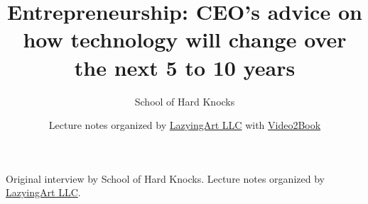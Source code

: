 \documentclass[11pt,oneside]{book}
\begin{document}
\frontmatter
\title{Entrepreneurship: CEO's advice on how technology will change over the next 5 to 10 years}
\author{School of Hard Knocks}
\date{Lecture notes organized by \href{https://lazying.art}{LazyingArt LLC} with \href{https://github.com/lachlanchen/Video2Book}{Video2Book}}
\maketitle
\begin{center}
\small Original interview by School of Hard Knocks. Lecture notes organized by \href{https://lazying.art}{LazyingArt LLC}.
\end{center}
\clearpage
\mainmatter

\end{document}
